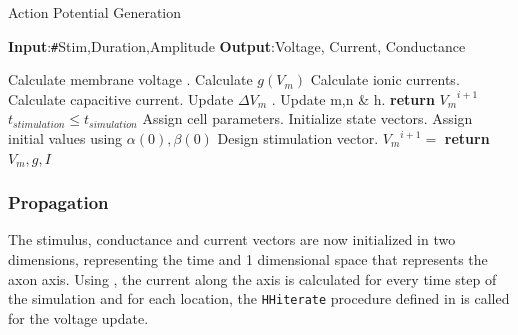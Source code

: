 \documentclass{IEEEtran}
\begin{document}
\begin{algorithm}[h]
    \caption{Action Potential Generation}\label{alg:apgen}
    \hspace*{\algorithmicindent}\textbf{Input}:\texttt{\#}Stim,Duration,Amplitude\newline
    \hspace*{\algorithmicindent}\textbf{Output}:Voltage, Current, Conductance
    \begin{algorithmic}[1]
     \label{proc:hhiterate}
        \State Calculate membrane voltage . 
        \State Calculate $g(V_m)$ 
        \State Calculate ionic currents. 
        \State Calculate capacitive current. 
        \State Update $\Delta V_m$ .
        \State Update m,n \& h. 
        \State \textbf{return} ${V_m}^{i+1}$
    \EndProcedure \\
    
    \Ensure $t_{stimulation} \le t_{simulation}$
    \State Assign cell parameters. 
    \State Initialize state vectors. 
    \State Assign initial values using $\alpha(0),\beta(0)$ 
    \State Design stimulation vector. 
        \State ${V_m}^{i+1} =$ 
    \EndFor
    \State \textbf{return} $V_m, g, I$
    \end{algorithmic}
\end{algorithm}

\subsubsection{Propagation}

The stimulus, conductance and current vectors are now initialized in two dimensions, representing the time and 1 dimensional space that represents the axon axis. Using , the current along the axis is calculated for every time step of the simulation and for each location, the \texttt{HHiterate} procedure defined in  is called for the voltage update. 
\end{document}
